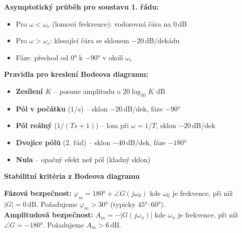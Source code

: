 \documentclass[a4paper,10pt]{article}
\begin{document}
\begin{vysvetlenibox}
\textbf{Asymptotický průběh pro soustavu 1. řádu:}
\begin{itemize}[noitemsep, leftmargin=1.4em, topsep=4pt]
    \item Pro $\omega < \omega_c$ (lomová frekvence): vodorovná čára na 0\,dB
    \item Pro $\omega > \omega_c$: klesající čára se sklonem $-20$\,dB/dekádu
    \item Fáze: přechod od 0° k $-90°$ v okolí $\omega_c$
\end{itemize}

\begin{center}
\end{center}

\textbf{Pravidla pro kreslení Bodeova diagramu:}
\begin{itemize}[noitemsep, leftmargin=1.4em, topsep=4pt]
    \item \textbf{Zesílení $K$} -- posune amplitudu o $20\log_{10}K$ dB
    \item \textbf{Pól v počátku} ($1/s$) -- sklon $-20$\,dB/dek, fáze $-90°$
    \item \textbf{Pól reálný} ($1/(Ts+1)$) -- lom při $\omega=1/T$, sklon $-20$\,dB/dek
    \item \textbf{Dvojice pólů} (2. řád) -- sklon $-40$\,dB/dek, fáze $-180°$
    \item \textbf{Nula} -- opačný efekt než pól (kladný sklon)
\end{itemize}

\textbf{Stabilitní kritéria z Bodeova diagramu}

\begin{vzorcebox}
\textbf{Fázová bezpečnost:} $\varphi_m = 180° + \angle G(j\omega_0)$
kde $\omega_0$ je frekvence, při níž $|G|=0\,\text{dB}$.
Požadujeme $\varphi_m > 30°$ (typicky $45°$--$60°$).\\[4pt]
\textbf{Amplitudová bezpečnost:} $A_m = -|G(j\omega_{\pi})|$
kde $\omega_{\pi}$ je frekvence, při níž $\angle G = -180°$.
Požadujeme $A_m > 6\,\text{dB}$.
\end{vzorcebox}


\end{vysvetlenibox}
\end{document}
